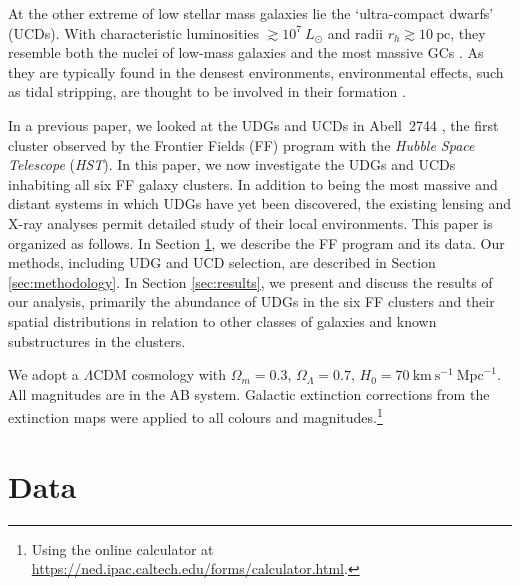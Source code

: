 \documentclass[iop,tighten,twocolumn,apj,floatfix]{emulateapj}
\begin{document}
At the other extreme of low stellar mass galaxies lie the `ultra-compact
dwarfs' (UCDs).
With characteristic luminosities $\gtrsim 10^7~L_{\odot}$ and radii $r_h
\gtrsim 10~\mathrm{pc}$, they resemble both the nuclei of low-mass galaxies
and the most massive GCs \citep{brodie2011, norris2014, forbes2014, janz2016}.
As they are typically found in the densest environments, environmental
effects, such as tidal stripping, are thought to be involved in their
formation \citep{bekki2003, pfeffer2013}.

In a previous paper, we looked at the UDGs and UCDs in Abell~2744
\citep{janssens2017}, the first cluster observed by the Frontier Fields (FF)
program with the \textit{Hubble Space Telescope} (\textit{HST}).
In this paper, we now investigate the UDGs and UCDs inhabiting all six FF
galaxy clusters.
In addition to being the most massive and distant systems in which UDGs have
yet been discovered, the existing lensing and X-ray analyses permit detailed
study of their local environments.
This paper is organized as follows.
In Section \ref{sec:data}, we describe the FF program and its data.
Our methods, including UDG and UCD selection, are described in Section
\ref{sec:methodology}.
In Section \ref{sec:results}, we present and discuss the results of our
analysis, primarily the abundance of UDGs in the six FF clusters and their
spatial distributions in relation to other classes of galaxies and known
substructures in the clusters.

We adopt a $\Lambda$CDM cosmology with $\Omega_m = 0.3$, $\Omega_{\Lambda} =
0.7$, $H_0 = 70~\mathrm{km}~\mathrm{s}^{-1}~\mathrm{Mpc}^{-1}$. All magnitudes
are in the AB system. Galactic extinction corrections from the
\cite{schlafly2011} extinction maps were applied to all colours and
magnitudes.\footnote{Using the online calculator at
\url{https://ned.ipac.caltech.edu/forms/calculator.html}.}

\section{Data}\label{sec:data}
\end{document}
